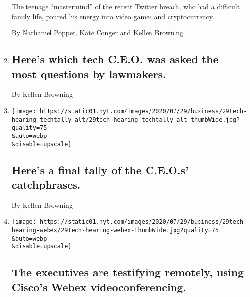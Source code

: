 \begin{enumerate}
  The teenage ``mastermind'' of the recent Twitter breach, who had a
  difficult family life, poured his energy into video games and
  cryptocurrency.

  By Nathaniel Popper, Kate Conger and Kellen Browning
\item
  \href{/live/2020/07/29/technology/tech-ceos-hearing-testimony/heres-which-tech-ceo-was-asked-the-most-questions-by-lawmakers}{}

  \hypertarget{heres-which-tech-ceo-was-asked-the-most-questions-by-lawmakers}{%
  \subsection{Here's which tech C.E.O. was asked the most questions by
  lawmakers.}\label{heres-which-tech-ceo-was-asked-the-most-questions-by-lawmakers}}

  By Kellen Browning
\item
  \href{/live/2020/07/29/technology/tech-ceos-hearing-testimony/what-ceos-said}{}

  \texttt{[image: https://static01.nyt.com/images/2020/07/29/business/29tech-hearing-techtally-alt/29tech-hearing-techtally-alt-thumbWide.jpg?quality=75\\\&auto=webp\\\&disable=upscale]}

  \hypertarget{heres-a-final-tally-of-the-ceos-catchphrases}{%
  \subsection{Here's a final tally of the C.E.O.s'
  catchphrases.}\label{heres-a-final-tally-of-the-ceos-catchphrases}}

  By Kellen Browning
\item
  \href{/live/2020/07/29/technology/tech-ceos-hearing-testimony/the-executives-are-testifying-remotely-using-ciscos-webex-videoconferencing}{}

  \texttt{[image: https://static01.nyt.com/images/2020/07/29/business/29tech-hearing-webex/29tech-hearing-webex-thumbWide.jpg?quality=75\\\&auto=webp\\\&disable=upscale]}

  \hypertarget{the-executives-are-testifying-remotely-using-ciscos-webex-videoconferencing}{%
  \subsection{The executives are testifying remotely, using Cisco's
  Webex
  videoconferencing.}\label{the-executives-are-testifying-remotely-using-ciscos-webex-videoconferencing}}


\end{enumerate}
